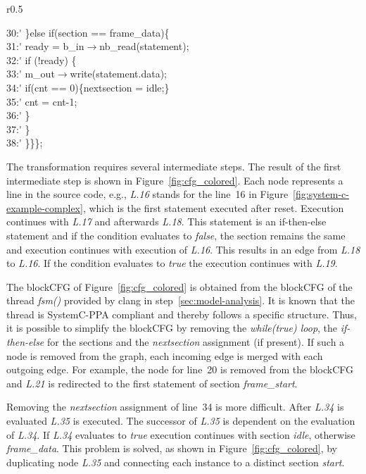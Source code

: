 \begin{wrapfigure}{r}{0.5\textwidth}
\begin{minipage}{0.9\linewidth}
\begin{tabbing}
30:\'\>\>\> \}else if(section == frame\_data)\{ \\
31:\'\>\>\>\> ready = b\_in$\rightarrow$nb\_read(statement);\\
32:\'\>\>\>\> if (!ready) \{ \\
33:\'\>\>\>\>\> m\_out$\rightarrow$write(statement.data);\\
34:\'\>\>\>\>\> if(cnt == 0)\{nextsection = idle;\}\\
35:\'\>\>\>\>\> cnt = cnt-1;\\
36:\'\>\>\>\> \}\\
37:\'\>\>\> \}\\
38:\'\>\> \}\}\};\\
    \end{tabbing}
  \end{minipage}
  
  \caption{SystemC-PPA example}
  \label{fig:system-c-example-complex}
\end{wrapfigure}



The transformation requires several intermediate steps.
The result of the first intermediate step is shown in Figure~\ref{fig:cfg_colored}.
Each node represents a line in the source code, e.g., \textit{L.16} stands for the line~16 in Figure~\ref{fig:system-c-example-complex}, which is the first statement executed after reset. 
Execution continues with \textit{L.17} and afterwards \textit{L.18}.
This statement is an if-then-else statement and if the condition evaluates to \textit{false}, the section remains the same and execution continues with execution of \textit{L.16}. 
This results in an edge from \textit{L.18} to \textit{L.16}. 
If the condition evaluates to \textit{true} the execution continues with \textit{L.19}.

The blockCFG of Figure~\ref{fig:cfg_colored} is obtained from the blockCFG of the thread \textit{fsm()} provided by clang in step~\ref{sec:model-analysis}.
It is known that the thread is SystemC-PPA compliant and thereby follows a specific structure.
Thus, it is possible to simplify the blockCFG by removing the \emph{while(true) loop}, the \emph{if-then-else} for the sections and the \emph{nextsection} assignment (if present).
If such a node is removed from the graph, each incoming edge is merged with each outgoing edge. 
For example, the node for line~20 is removed from the blockCFG and \textit{L.21} is redirected to the first statement of section \textit{frame\_start}.

Removing the \textit{nextsection} assignment of line~34 is more difficult. 
After \textit{L.34} is evaluated \textit{L.35} is executed. 
The successor of \textit{L.35} is dependent on the evaluation of \textit{L.34}. 
If \textit{L.34} evaluates to \textit{true} execution continues with section \textit{idle}, otherwise \textit{frame\_data}. 
This problem is solved, as shown in Figure~\ref{fig:cfg_colored}, by duplicating node \textit{L.35} and connecting each instance to a distinct section \textit{start}. 

